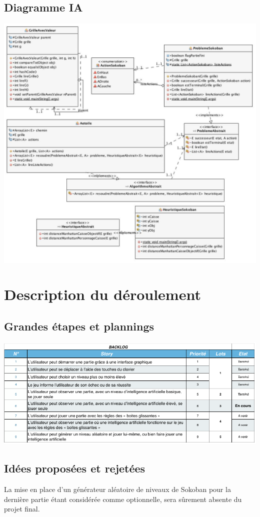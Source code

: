 \documentclass[a4paper,12pt]{article} %
\begin{document}
\subsection{Diagramme IA}
\includegraphics[scale=0.46]{ia2.jpg}
\newpage
\section{Description du déroulement} 
\subsection{Grandes étapes et plannings}
\begin{center} \includegraphics[scale=0.7]{backlogfinal.png} \end{center}

\subsection{Idées proposées et rejetées}
La mise en place d'un générateur aléatoire de niveaux de Sokoban pour la dernière partie étant considérée comme optionnelle, sera sûrement absente du projet final.
\end{document}
